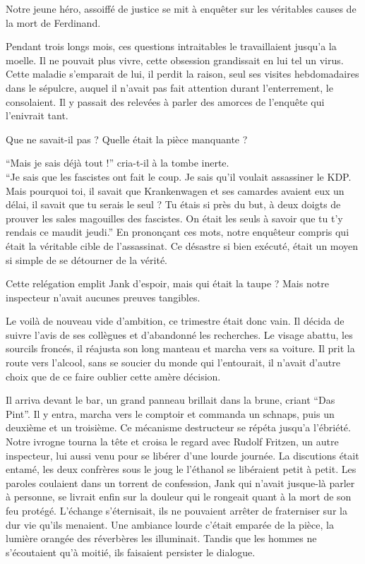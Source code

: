 Notre jeune héro, assoiffé de justice se mit à enquêter sur les véritables causes de la mort de Ferdinand.

Pendant trois longs mois, ces questions intraitables le travaillaient jusqu'a la moelle.
Il ne pouvait plus vivre, cette obsession grandissait en lui tel un virus.
Cette maladie s'emparait de lui, il perdit la raison, seul ses visites hebdomadaires dans le sépulcre, auquel il n'avait
pas fait attention durant l'enterrement, le consolaient. Il y passait des relevées à parler des amorces de l'enquête qui l'enivrait tant.

Que ne savait-il pas ? Quelle était la pièce manquante ?

\enquote{Mais je sais déjà tout !} cria-t-il à la tombe inerte.\\
\enquote{Je sais que les fascistes ont fait le coup. Je sais qu'il voulait assassiner le KDP.
Mais pourquoi toi, il savait que Krankenwagen et ses camardes avaient eux un délai, il savait que tu serais le seul ?
Tu étais si près du but, à deux doigts de prouver les sales magouilles des fascistes.
On était les seuls à savoir que tu t'y rendais ce maudit jeudi.} En prononçant ces mots, notre enquêteur compris qui était la véritable cible de l'assassinat.
Ce désastre si bien exécuté, était un moyen si simple de se détourner de la vérité.

Cette relégation emplit Jank d'espoir, mais qui était la taupe ? Mais notre inspecteur n'avait aucunes preuves tangibles. 

Le voilà de nouveau vide d'ambition, ce trimestre était donc vain. 
Il décida de suivre l'avis de ses collègues et d'abandonné les recherches.
Le visage abattu, les sourcils froncés, il réajusta son long manteau et marcha vers sa voiture.
Il prit la route vers l'alcool, sans se soucier du monde qui l'entourait, il n'avait d'autre choix que de ce faire oublier cette amère décision.

Il arriva devant le bar, un grand panneau brillait dans la brune, criant \enquote{{\tgothfamily Das Pint}}.
Il y entra, marcha vers le comptoir et commanda un schnaps, puis un deuxième et un troisième.
Ce mécanisme destructeur se répéta jusqu'a l'ébriété. 
Notre ivrogne tourna la tête et croisa le regard avec Rudolf Fritzen, un autre inspecteur, lui aussi venu pour se libérer d'une lourde journée.
La discutions était entamé, les deux confrères sous le joug le l'éthanol se libéraient petit à petit. 
Les paroles coulaient dans un torrent de confession, Jank qui n'avait jusque-là parler à personne, se livrait enfin 
sur la douleur qui le rongeait quant à la mort de son feu protégé.
L'échange s'éternisait, ils ne pouvaient arrêter de fraterniser sur la dur vie qu'ils menaient.
Une ambiance lourde c'était emparée de la pièce, la lumière orangée des réverbères les illuminait. 
Tandis que les hommes ne s'écoutaient qu'à moitié, ils faisaient persister le dialogue.

